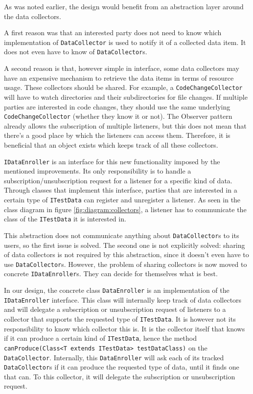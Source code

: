\documentclass[i2]{oss}
\newcommand{\class}[1]{\texttt{#1}}
\newcommand{\method}[1]{\texttt{#1}}
\begin{document}
As was noted earlier, the design would benefit from an abstraction layer around the data collectors.

A first reason was that an interested party does not need to know which implementation of \class{DataCollector} is used to notify it of a collected data item. It does not even have to know of \class{DataCollector}s.

A second reason is that, however simple in interface, some data collectors may have an expensive mechanism to retrieve the data items in terms of resource usage.
These collectors should be shared.
For example, a \class{CodeChangeCollector} will have to watch directories and their subdirectories for file changes.
If multiple parties are interested in code changes, they should use the same underlying \class{CodeChangeCollector} (whether they know it or not).
The Observer pattern already allows the subscription of multiple listeners, but this does not mean that there's a good place by which the listeners can access them. 
Therefore, it is beneficial that an object exists which keeps track of all these collectors.

\class{IDataEnroller} is an interface for this new functionality imposed by the mentioned improvements.
Its only responsibility is to handle a subscription/unsubscription request for a listener for a specific kind of data.
Through classes that implement this interface, parties that are interested in a certain type of \class{ITestData} can register and unregister a listener.
As seen in the class diagram in figure \ref{fig:diagram:collectors}, a listener has to communicate the class of the \class{ITestData} it is interested in.

This abstraction does not communicate anything about \class{DataCollector}s to its users, so the first issue is solved.
The second one is not explicitly solved: sharing of data collectors is not required by this abstraction, since it doesn't even have to use \class{DataCollector}s.
However, the problem of sharing collectors is now moved to concrete \class{IDataEnroller}s.
They can decide for themselves what is best.

In our design, the concrete class \class{DataEnroller} is an implementation of the \class{IDataEnroller} interface.
This class will internally keep track of data collectors and will delegate a subscription or unsubscription request of listeners to a collector that supports the requested type of \class{ITestData}.
It is however not its responsibility to know which collector this is.
It is the collector itself that knows if it can produce a certain kind of \class{ITestData}, hence the method \method{canProduce(Class<T extends ITestData> testDataClass)} on the \class{DataCollector}.
Internally, this \class{DataEnroller} will ask each of its tracked \class{DataCollector}s if it can produce the requested type of data, until it finds one that can.
To this collector, it will delegate the subscription or unsubscription request.
\end{document}
